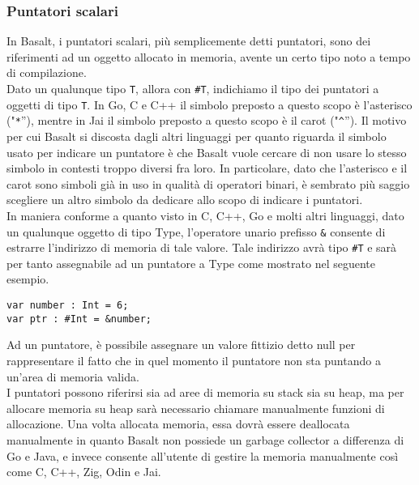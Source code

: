 \subsubsection{Puntatori scalari}
In Basalt, i puntatori scalari, più semplicemente detti puntatori, sono dei riferimenti ad un oggetto allocato in memoria, 
avente un certo tipo noto a tempo di compilazione. \\

Dato un qualunque tipo \texttt{T}, allora con \texttt{\#T}, indichiamo il tipo dei puntatori a oggetti di tipo \texttt{T}. In Go, C e C++ il simbolo preposto a 
questo scopo è l’asterisco ("\texttt{*}”), mentre in Jai il simbolo preposto a questo scopo è il carot ("\texttt{\^}”). Il motivo per cui 
Basalt si discosta dagli altri linguaggi per quanto riguarda il simbolo usato per indicare un puntatore è che Basalt vuole cercare di non usare lo stesso 
simbolo in contesti troppo diversi fra loro. In particolare, dato che l’asterisco e il carot sono simboli già in uso in qualità di operatori binari, 
è sembrato più saggio scegliere un altro simbolo da dedicare allo scopo di indicare i puntatori. \\  

In maniera conforme a quanto visto in C, C++, Go e molti altri linguaggi, dato un qualunque oggetto di tipo Type, l’operatore unario prefisso \texttt{\&} 
consente di estrarre l’indirizzo di memoria di tale valore. Tale indirizzo avrà tipo \texttt{\#T} e sarà per tanto assegnabile ad un puntatore 
a Type come mostrato nel seguente esempio. \\

\vspace{0.5cm}
\begin{lstlisting}[frame=single]
var number : Int = 6;
var ptr : #Int = &number;
\end{lstlisting}
\vspace{0.5cm}

Ad un puntatore, è possibile assegnare un valore fittizio detto null per rappresentare il fatto che in quel momento il puntatore non sta puntando a 
un’area di memoria valida. \\

I puntatori possono riferirsi sia ad aree di memoria su stack sia su heap, ma per allocare memoria su 
heap sarà necessario chiamare manualmente funzioni di allocazione. Una volta allocata memoria, essa dovrà essere 
deallocata manualmente in quanto Basalt non possiede un garbage collector a differenza di Go e Java, e invece consente 
all’utente di gestire la memoria manualmente così come C, C++, Zig, Odin e Jai. \\


